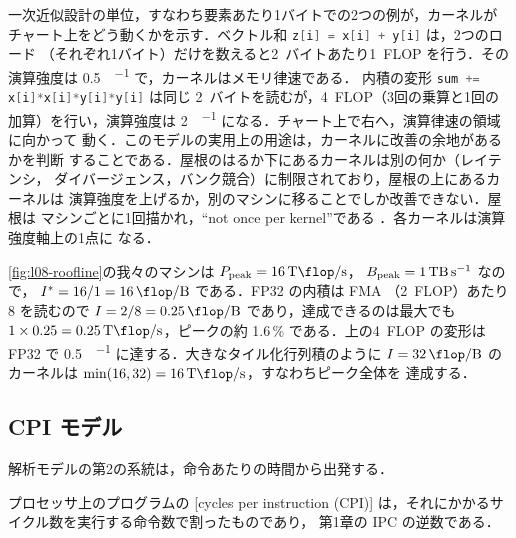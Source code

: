 \documentclass[../main.tex]{subfiles}
\begin{document}
一次近似設計の単位，すなわち要素あたり1バイトでの2つの例が，カーネルが
チャート上をどう動くかを示す．ベクトル和
\mbox{\lstinline[language=C++]!z[i] = x[i] + y[i]!} は，2つのロード
（それぞれ1バイト）だけを数えると2~バイトあたり1~FLOP を行う．その
演算強度は \SI{0.5}{\flop\per\byte} で，カーネルはメモリ律速である．
内積の変形
\mbox{\lstinline[language=C++]!sum += x[i]*x[i]*y[i]*y[i]!} は同じ
2~バイトを読むが，4~FLOP（3回の乗算と1回の加算）を行い，演算強度は
\SI{2}{\flop\per\byte} になる．チャート上で右へ，演算律速の領域に向かって
動く．このモデルの実用上の用途は，カーネルに改善の余地があるかを判断
することである．屋根のはるか下にあるカーネルは別の何か（レイテンシ，
ダイバージェンス，バンク競合）に制限されており，屋根の上にあるカーネルは
演算強度を上げるか，別のマシンに移ることでしか改善できない．屋根は
マシンごとに1回描かれ，\enquote{not once per kernel}である
\cite{williams2009roofline}．各カーネルは演算強度軸上の1点に
なる．

\begin{example}
  \label{ex:l08-roofline}
  \cref{fig:l08-roofline}の我々のマシンは
  $P_{\text{peak}} = \SI{16}{\tera\flop\per\second}$，
  $B_{\text{peak}} = \SI{1}{\tera\byte\per\second}$ なので，
  $I^{*} = 16/1 = \SI{16}{\flop\per\byte}$ である．FP32 の内積は FMA
  （2~FLOP）あたり \SI{8}{\byte} を読むので
  $I = 2/8 = \SI{0.25}{\flop\per\byte}$ であり，達成できるのは最大でも
  $1 \times 0.25 = \SI{0.25}{\tera\flop\per\second}$，ピークの約
  1.6\,\% である．上の4~FLOP の変形は FP32 で
  \SI{0.5}{\flop\per\byte} に達する．大きなタイル化行列積のように
  $I = \SI{32}{\flop\per\byte}$ のカーネルは
  $\min(16, 32) = \SI{16}{\tera\flop\per\second}$，すなわちピーク全体を
  達成する．
\end{example}

\subsection{CPI モデル}

解析モデルの第2の系統は，命令あたりの時間から出発する．

\begin{definition}[CPI]
  \label{def:l08-cpi}
  プロセッサ上のプログラムの
  [cycles per instruction (CPI)]
  は，それにかかるサイクル数を実行する命令数で割ったものであり，
  第1章の IPC の逆数である．
\end{definition}
\end{document}
